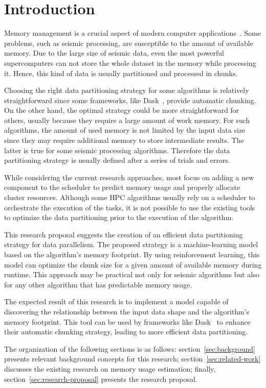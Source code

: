 \section{Introduction}
\label{sec:introduction}

Memory management is a crucial aspect of modern computer applications~\cite{pupykina2019}.
Some problems, such as seismic processing, are susceptible to the amount of available memory.
Due to the large size of seismic data, even the most powerful supercomputers can not store the whole dataset in the memory while processing it.
Hence, this kind of data is usually partitioned and processed in chunks.

Choosing the right data partitioning strategy for some algorithms is relatively straightforward since some frameworks, like Dask~\cite{dask}, provide automatic chunking.
On the other hand, the optimal strategy could be more straightforward for others, usually because they require a large amount of work memory.
For such algorithms, the amount of used memory is not limited by the input data size since they may require additional memory to store intermediate results.
The latter is true for some seismic processing algorithms.
Therefore the data partitioning strategy is usually defined after a series of trials and errors.

While considering the current research approaches, most focus on adding a new component to the scheduler to predict memory usage and properly allocate cluster resources.
Although some \ac{HPC} algorithms usually rely on a scheduler to orchestrate the execution of the tasks, it is not possible to use the existing tools to optimize the data partitioning prior to the execution of the algorithm.

This research proposal suggests the creation of an efficient data partitioning strategy for data parallelism.
The proposed strategy is a machine-learning model based on the algorithm's memory footprint.
By using reinforcement learning, this model can optimize the chunk size for a given amount of available memory during runtime.
This approach may be practical not only for seismic algorithms but also for any other algorithm that has predictable memory usage.

The expected result of this research is to implement a model capable of discovering the relationship between the input data shape and the algorithm's memory footprint.
This tool can be used by frameworks like Dask~\cite{dask} to enhance their automatic chunking strategy, leading to more efficient data partitioning.

The organization of the following sections is as follows:
section~\ref{sec:background} presents relevant background concepts for this research;
section~\ref{sec:related-work} discusses the existing research on memory usage estimation;
finally, section~\ref{sec:research-proposal} presents the research proposal.
